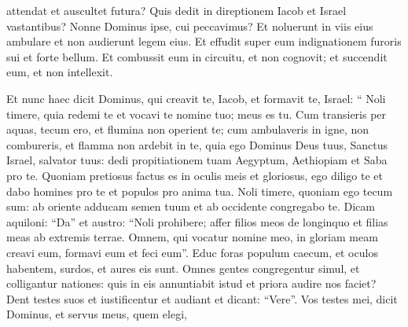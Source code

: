 \begin{biblechapter}
\begin{biblechapter}
\begin{biblechapter}
\begin{biblechapter}
\begin{biblechapter}
\begin{biblechapter}
\begin{biblechapter}
\begin{biblechapter}
\begin{biblechapter}
\begin{biblechapter}
\begin{biblechapter}
\begin{biblechapter}
\begin{biblechapter}
\begin{biblechapter}
\begin{biblechapter}
\begin{biblechapter}
\begin{biblechapter}
\begin{biblechapter}
\begin{biblechapter}
\begin{biblechapter}
\begin{biblechapter}
\begin{biblechapter}
\begin{biblechapter}
\begin{biblechapter}
\begin{biblechapter}
\begin{biblechapter}
\begin{biblechapter}
\begin{biblechapter}
\begin{biblechapter}
\begin{biblechapter}
\begin{biblechapter}
\begin{biblechapter}
\begin{biblechapter}
\begin{biblechapter}
\begin{biblechapter}
\begin{biblechapter}
\begin{biblechapter}
\begin{biblechapter}
\begin{biblechapter}
\begin{biblechapter}
\begin{biblechapter}
\begin{biblechapter}
 attendat et auscultet futura?
 \verse Quis dedit in direptionem Iacob
 et Israel vastantibus?
 Nonne Dominus ipse, cui peccavimus?
 Et noluerunt in viis eius ambulare
 et non audierunt legem eius.
 \verse Et effudit super eum indignationem furoris sui
 et forte bellum.
 Et combussit eum in circuitu, et non cognovit;
 et succendit eum, et non intellexit.
 
\begin{biblechapter}
\verse Et nunc haec dicit Dominus,
 qui creavit te, Iacob, et formavit te, Israel:
 “ Noli timere, quia redemi te
 et vocavi te nomine tuo; meus es tu.
 \verse Cum transieris per aquas, tecum ero,
 et flumina non operient te;
 cum ambulaveris in igne, non combureris,
 et flamma non ardebit in te,
 \verse quia ego Dominus Deus tuus,
 Sanctus Israel, salvator tuus:
 dedi propitiationem tuam Aegyptum,
 Aethiopiam et Saba pro te.
 \verse Quoniam pretiosus factus es in oculis meis
 et gloriosus, ego diligo te
 et dabo homines pro te
 et populos pro anima tua.
 \verse Noli timere, quoniam ego tecum sum:
 ab oriente adducam semen tuum
 et ab occidente congregabo te.
 \verse Dicam aquiloni: “Da”
 et austro: “Noli prohibere;
 affer filios meos de longinquo
 et filias meas ab extremis terrae.
 \verse Omnem, qui vocatur nomine meo,
 in gloriam meam creavi eum,
 formavi eum et feci eum”.
 \verse Educ foras populum caecum, et oculos habentem,
 surdos, et aures eis sunt.
 \verse Omnes gentes congregentur simul,
 et colligantur nationes:
 quis in eis annuntiabit istud
 et priora audire nos faciet?
 Dent testes suos et iustificentur
 et audiant et dicant: “Vere”.
 \verse Vos testes mei, dicit Dominus,
 et servus meus, quem elegi,

\end{biblechapter}
\end{biblechapter}
\end{biblechapter}
\end{biblechapter}
\end{biblechapter}
\end{biblechapter}
\end{biblechapter}
\end{biblechapter}
\end{biblechapter}
\end{biblechapter}
\end{biblechapter}
\end{biblechapter}
\end{biblechapter}
\end{biblechapter}
\end{biblechapter}
\end{biblechapter}
\end{biblechapter}
\end{biblechapter}
\end{biblechapter}
\end{biblechapter}
\end{biblechapter}
\end{biblechapter}
\end{biblechapter}
\end{biblechapter}
\end{biblechapter}
\end{biblechapter}
\end{biblechapter}
\end{biblechapter}
\end{biblechapter}
\end{biblechapter}
\end{biblechapter}
\end{biblechapter}
\end{biblechapter}
\end{biblechapter}
\end{biblechapter}
\end{biblechapter}
\end{biblechapter}
\end{biblechapter}
\end{biblechapter}
\end{biblechapter}
\end{biblechapter}
\end{biblechapter}
\end{biblechapter}
